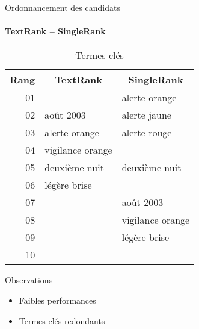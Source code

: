   \begin{frame}{Ordonnancement des candidats}\framesubtitle{TextRank -- SingleRank}
    \begin{table}
      \centering
      \begin{tabular}{r|l|l}
        \toprule
        \textbf{Rang} & \multicolumn{1}{c|}{\textbf{TextRank}} & \multicolumn{1}{c}{\textbf{SingleRank}} \\
        \hline
        01 & \cellcolor{termithorange!30}{août 2012} & alerte orange \\
        02 & août 2003 & alerte jaune \\
        03 & alerte orange & alerte rouge \\
        04 & vigilance orange & \cellcolor{termithorange!30}{alerte} \\
        05 & deuxième nuit & deuxième nuit \\
        06 & légère brise & \cellcolor{termithorange!30}{août 2012} \\
        07 & & août 2003 \\
        08 & & vigilance orange \\
        09 & & légère brise \\
        10 & & \cellcolor{termithorange!30}{Luxembourg} \\
        \bottomrule
      \end{tabular}

      \caption{Termes-clés}
    \end{table}

    \begin{block}{Observations}
      \begin{itemize}
        \item{Faibles performances}
        \item{Termes-clés redondants}
      \end{itemize}
    \end{block}
  \end{frame}

